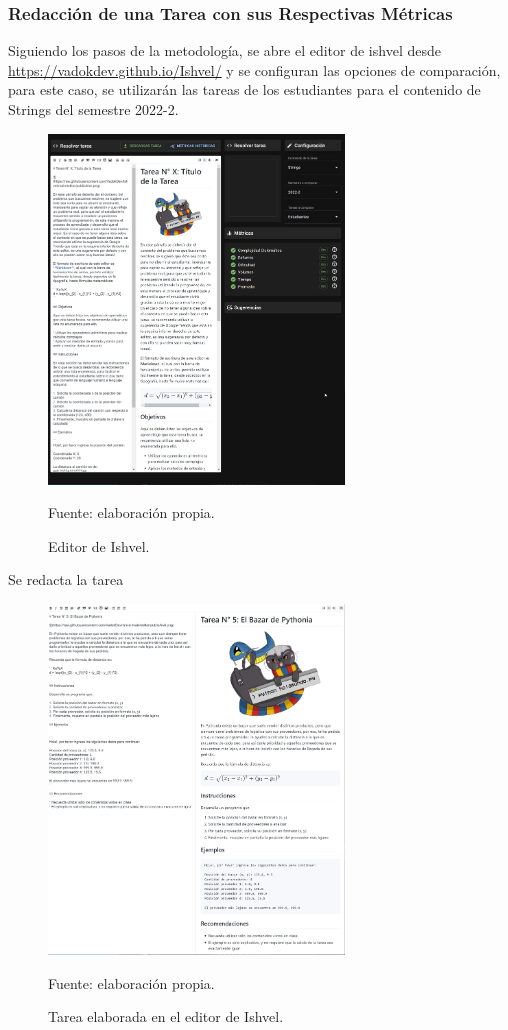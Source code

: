 \documentclass[letterpaper,12pt]{article}
\begin{document}
\subsubsection{Redacción de una Tarea con sus Respectivas Métricas}
Siguiendo los pasos de la metodología, se abre el editor de ishvel desde \url{https://vadokdev.github.io/Ishvel/} y se configuran las opciones de comparación, para este caso, se utilizarán las tareas de los estudiantes para el contenido de Strings del semestre 2022-2.
\begin{figure}[H]
  \centering
  \includegraphics[width=0.7\textwidth]{figures/redact4.png}
  \caption{Editor de Ishvel.} Fuente: elaboración propia.
  \label{img:redact1}
\end{figure}
Se redacta la tarea
\begin{figure}[H]
  \centering
  \includegraphics[width=0.7\textwidth]{figures/redact2.png}
  \caption{Tarea elaborada en el editor de Ishvel.} Fuente: elaboración propia.
  \label{img:redact2}
\end{figure}
\end{document}
